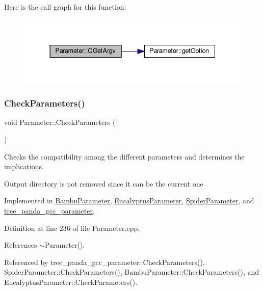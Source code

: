 Here is the call graph for this function\+:
\nopagebreak
\begin{figure}[H]
\begin{center}
\leavevmode
\includegraphics[width=337pt]{dc/dab/classParameter_ab6cceaeb45d6ff951af6befd227c73b2_cgraph}
\end{center}
\end{figure}
\mbox{\label{classParameter_a87315799c1a893687f796890f5d4f44d}} 
\subsubsection{\texorpdfstring{Check\+Parameters()}{CheckParameters()}}
{\footnotesize\ttfamily void Parameter\+::\+Check\+Parameters (\begin{DoxyParamCaption}{ }\end{DoxyParamCaption})\hspace{0.3cm}{\ttfamily [pure virtual]}}



Checks the compatibility among the different parameters and determines the implications. 

Output directory is not removed since it can be the current one 

Implemented in \hyperlink{classBambuParameter_aa1f5172814a5b7937b261509db53da9d}{Bambu\+Parameter}, \hyperlink{classEucalyptusParameter_a669c0350f1d4997568f0d9121abe9c3a}{Eucalyptus\+Parameter}, \hyperlink{classSpiderParameter_a8e06c5f840c91a5207444d4f3fad6663}{Spider\+Parameter}, and \hyperlink{classtree__panda__gcc__parameter_a848c8dc5dc64dbd6344d3b0a99f3617b}{tree\+\_\+panda\+\_\+gcc\+\_\+parameter}.



Definition at line 236 of file Parameter.\+cpp.



References $\sim$\+Parameter().



Referenced by tree\+\_\+panda\+\_\+gcc\+\_\+parameter\+::\+Check\+Parameters(), Spider\+Parameter\+::\+Check\+Parameters(), Bambu\+Parameter\+::\+Check\+Parameters(), and Eucalyptus\+Parameter\+::\+Check\+Parameters().

